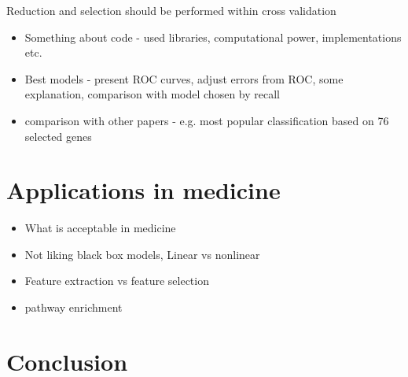 \documentclass[12pt, wide]{mwart}
\begin{document}
Reduction and selection should be performed within cross validation

\begin{itemize}
    \item Something about code - used libraries, computational power, implementations etc.
    \item Best models - present ROC curves, adjust errors from ROC, some explanation, comparison with model chosen by recall
    \item comparison with other papers - e.g. most popular classification based on 76 selected genes
\end{itemize}


\section{Applications in medicine} \label{section:application}

\begin{itemize}
    \item What is acceptable in medicine
    \item Not liking black box models, Linear vs nonlinear
    \item Feature extraction vs feature selection
    \item pathway enrichment
\end{itemize}

\section{Conclusion}



%
\end{document}
